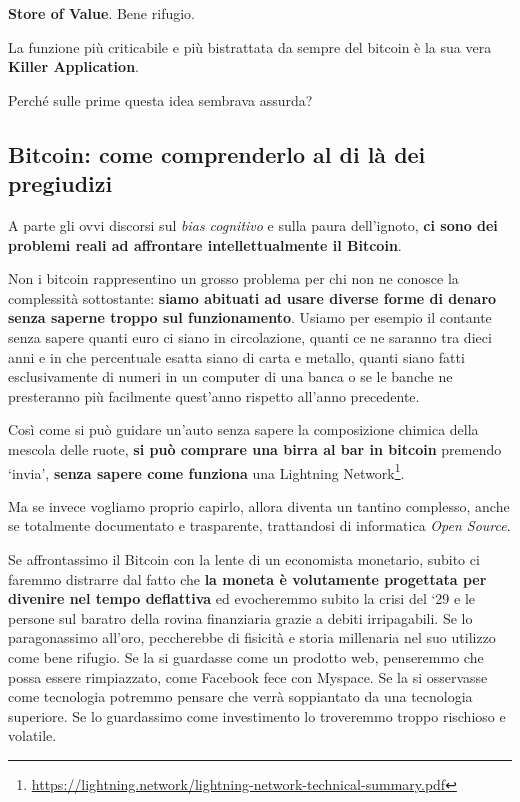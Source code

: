 \documentclass[a4paper,12pt,italian]{article}
\begin{document}
\bigskip


\textbf{Store of Value}. Bene rifugio.

\bigskip

La funzione più criticabile e più bistrattata da sempre del bitcoin è la sua vera \textbf{Killer
Application}.

\bigskip

Perché sulle prime questa idea sembrava assurda?

\subsection*{Bitcoin: come comprenderlo al di là dei pregiudizi}


A parte gli ovvi discorsi sul \emph{bias cognitivo} e sulla paura dell’ignoto, \textbf{ci sono dei problemi reali ad affrontare
intellettualmente il Bitcoin}.

\smallskip

Non i bitcoin rappresentino un  grosso problema per chi non ne conosce la complessità sottostante: 
\textbf{siamo abituati ad usare diverse forme di denaro senza saperne troppo sul funzionamento}. Usiamo per esempio il contante senza sapere 
quanti euro ci siano in circolazione, quanti ce ne saranno
tra dieci anni e in che percentuale esatta siano di carta e metallo, quanti siano fatti esclusivamente di numeri in un computer di una
banca o se le banche ne presteranno più facilmente quest'anno rispetto all’anno precedente.

Così come si può guidare un’auto senza sapere la composizione chimica della mescola delle ruote, \textbf{si può
comprare una birra al bar in bitcoin} premendo ‘invia’, \textbf{senza sapere come funziona}
una Lightning Network\footnote{\url{https://lightning.network/lightning-network-technical-summary.pdf}}.

\smallskip


Ma se invece vogliamo proprio capirlo, allora diventa un tantino complesso, anche se totalmente documentato e
trasparente, trattandosi di informatica \textit{Open Source}.


\bigskip


Se affrontassimo il Bitcoin con la lente di un economista monetario, subito ci faremmo distrarre dal fatto che \textbf{la
moneta è volutamente progettata per divenire nel tempo deflattiva} ed evocheremmo subito la crisi del ‘29 e le persone
sul baratro della rovina finanziaria grazie a debiti irripagabili. Se lo paragonassimo all’oro, peccherebbe di fisicità e storia millenaria 
nel suo utilizzo come bene rifugio. Se la si guardasse
come un prodotto web, penseremmo che possa essere rimpiazzato, come Facebook fece con Myspace. Se la si osservasse come
tecnologia potremmo pensare che verrà soppiantato da una tecnologia superiore. Se lo guardassimo come investimento lo
troveremmo troppo rischioso e volatile.
\end{document}
